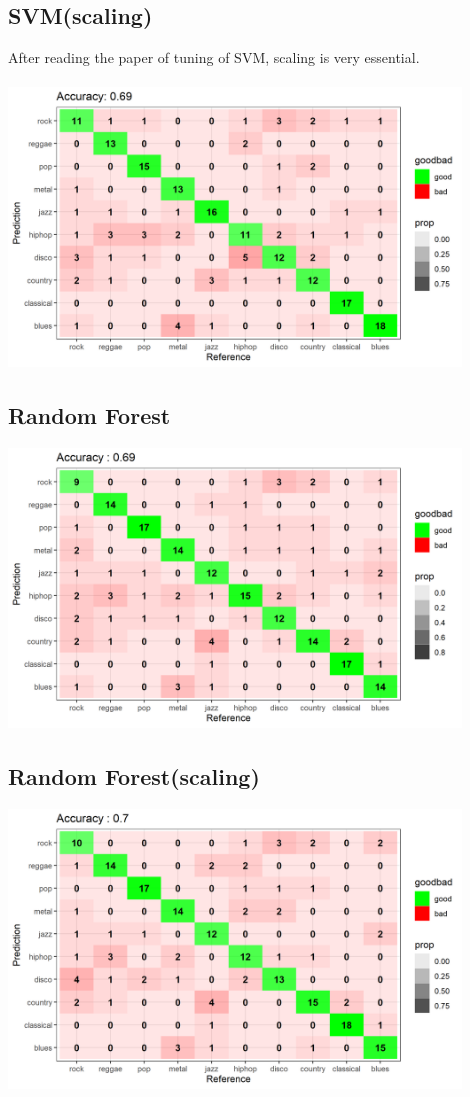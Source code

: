 \documentclass[12pt,a4paper]{article}
\begin{document}
\subsection{SVM(scaling)}
After reading the paper of tuning of SVM, scaling is very essential.\\
\\
\includegraphics[width=0.9\textwidth]{confusionMatrix_svm_std.png}
\newpage

\subsection{Random Forest}
\includegraphics[width=0.9\textwidth]{confusionMatrix_randomforest.png}
\subsection{Random Forest(scaling)}
\includegraphics[width=0.9\textwidth]{confusionMatrix_randomforest_std.png}
\end{document}
